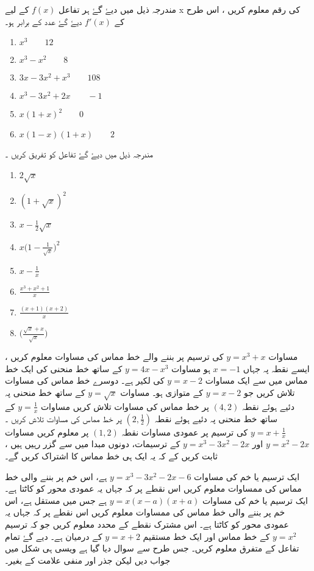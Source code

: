    مندرجہ ذیل میں  دیۓ گۓ ہر تفاعل \(f(x)\) کے لیے x کی رقم معلوم کریں ، اس طرح کے \(f'(x)\) دیۓ گۓ عدد کے برابر ہو۔

\begin{enumerate}[.a]
\item \(x^3 \quad \quad 12\)
\item \(x^3-x^2 \quad \quad 8\)
\item \(3x-3x^2+x^3 \quad \quad 108\)
\item \(x^3 -3x^2 +2x \quad \quad -1\)
\item \(x(1+x)^2 \quad \quad 0\)
\item \(x(1-x)(1+x) \quad \quad 2\)
\end{enumerate}
 مندرجہ ذیل میں دیۓ گۓ تفاعل کو تفریق کریں ۔

\begin{enumerate}[.a]
\item \(2\sqrt{x}\)
\item \((1+\sqrt{x})^2\)
\item \(x-\frac{1}{2} \sqrt{x}\)
\item \(x \big( 1-\frac{1}{\sqrt{x}}\big)^2\)
\item \(x-\frac{1}{x}\)
\item \(\frac{x^3+x^2+1}{x}\)
\item \(\frac{(x+1)(x+2)}{x}\)
\item \(\big( \frac{\sqrt{x}+x}{\sqrt{x}} \big)\)
\end{enumerate}
 مساوات \(y=x^3+x\) کی ترسیم پر بننے والے خط مماس کی مساوات معلوم کریں ، ایسے نقطہ پہ جہاں \(x=-1\) ہو
  مساوات \(y=4x-x^3\) کے ساتھ خط منحنی کی ایک خط مماس میں سے ایک مساوات \(y=x-2\) کی لکیر ہے۔ دوسرے خط مماس کی مساوات  تلاش کریں جو \(y=x-2\) کے متوازی ہو۔ 
 مساوات \(y=\sqrt{x}\) کے ساتھ خط منحنی  پہ دئیے ہوئے نقطہ \((4,2)\)  پر خط مماس کی مساوات تلاش کریں
  مساوات \(y=\frac{1}{x}\) کے ساتھ خط منحنی  پہ دئیے ہوئے نقطہ \((2,\frac{1}{2})\)  پر خط مماس کی مساوات تلاش کریں
۔ \(y=x+\frac{1}{x}\) کی ترسیم پر عمودی  مساوات نقطہ \((1,2)\) پر معلوم کریں 
مساوات  \(y=x^2-2x\) اور \(y=x^3-3x^2-2x\)   کے ترسیمات،  دونوں مبدا میں سے گزر رہیں ہیں ، ثابت کریں کے کہ یہ ایک ہی خط مماس کا اشتراک کریں گے۔ 





ایک ترسیم یا خم کی مساوات \(y=x^3-3x^2-2x-6\) ہے، اس خم پر بننے والی خط مماس کی ممساوات معلوم کریں اس نقطے پر کہ جہاں یہ عمودی محور کو کاٹتا ہے۔ 
ایک ترسیم یا خم کی مساوات \(y=x(x-a)(x+a)\) ہے جس میں  مستقل ہے، اس خم پر بننے والی خط مماس کی ممساوات معلوم کریں اس نقطے پر کہ جہاں یہ عمودی محور کو کاٹتا ہے۔ 
اس مشترک نقطے کے محدد معلوم کریں جو کہ ترسیم \(y=x^2\) کے خط مماس  اور ایک خط مستقیم \(y=x+2\) کے درمیان ہے۔
دیے گۓ تمام تفاعل کے متفرق معلوم کریں۔ جس طرح سے سوال دیا گیا ہے ویسی ہی شکل میں جواب دیں لیکن جذر اور منفی علامت کے بغیر۔

